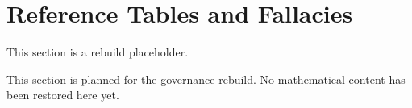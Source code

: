 \section{Reference Tables and Fallacies}

\begin{tcolorbox}[colback=gray!6, colframe=gray!40, arc=2pt,
  left=6pt, right=6pt, top=4pt, bottom=4pt,
  title={\small\textbf{Reference Toolkit - Planned}},
  fonttitle=\small\bfseries]
This section is a rebuild placeholder.
\end{tcolorbox}

This section is planned for the governance rebuild. No mathematical content has
been restored here yet.
